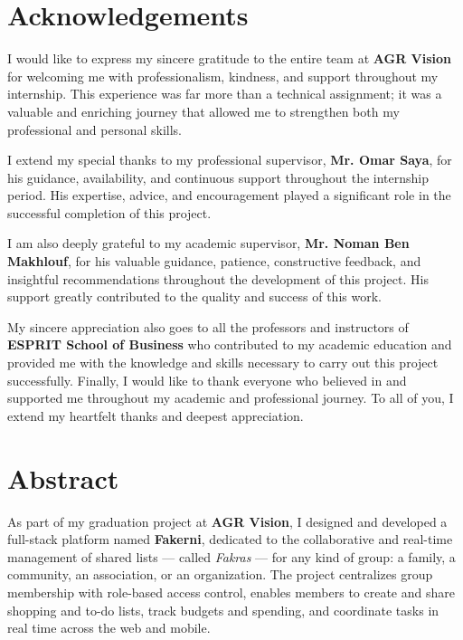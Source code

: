 \documentclass[12pt,a4paper,oneside]{report}
\newcommand{\mySchool}{ESPRIT School of Business}
\newcommand{\myCompany}{AGR Vision}
\newcommand{\myProSupervisor}{Mr. Omar Saya}
\newcommand{\myAcadSupervisor}{Mr. Noman Ben Makhlouf}
\begin{document}
\chapter*{Acknowledgements}
\thispagestyle{fancy}

I would like to express my sincere gratitude to the entire team at
\textbf{\myCompany} for welcoming me with professionalism, kindness, and support
throughout my internship. This experience was far more than a technical
assignment; it was a valuable and enriching journey that allowed me to
strengthen both my professional and personal skills.

\medskip
I extend my special thanks to my professional supervisor, \textbf{\myProSupervisor},
for his guidance, availability, and continuous support throughout the internship
period. His expertise, advice, and encouragement played a significant role in the
successful completion of this project.

\medskip
I am also deeply grateful to my academic supervisor, \textbf{\myAcadSupervisor},
for his valuable guidance, patience, constructive feedback, and insightful
recommendations throughout the development of this project. His support greatly
contributed to the quality and success of this work.

\medskip
My sincere appreciation also goes to all the professors and instructors of
\textbf{\mySchool} who contributed to my academic education and provided me with
the knowledge and skills necessary to carry out this project successfully.
Finally, I would like to thank everyone who believed in and supported me
throughout my academic and professional journey. To all of you, I extend my
heartfelt thanks and deepest appreciation.

\chapter*{Abstract}
\thispagestyle{fancy}

As part of my graduation project at \textbf{\myCompany}, I designed and developed
a full-stack platform named \textbf{Fakerni}, dedicated to the collaborative and
real-time management of shared lists --- called \emph{Fakras} --- for any kind of
group: a family, a community, an association, or an organization. The project
centralizes group membership with role-based access control, enables members to
create and share shopping and to-do lists, track budgets and spending, and
coordinate tasks in real time across the web and mobile.
\end{document}
